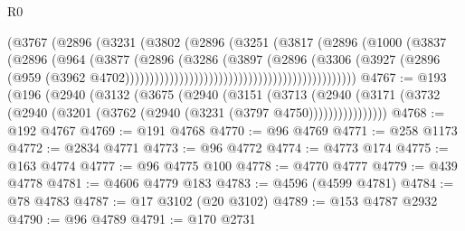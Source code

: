 \begin{lexlean}{R0}
\begin{coremodule}
                                                      (@3767
                                                        (@2896
                                                          (@3231
                                                            (@3802
                                                              (@2896
                                                                (@3251
                                                                  (@3817
                                                                    (@2896
                                                                      (@1000
                                                                        (@3837
                                                                          (@2896
                                                                            (@964
                                                                              (@3877
                                                                                (@2896
                                                                                  (@3286
                                                                                    (@3897
                                                                                      (@2896
                                                                                        (@3306
                                                                                          (@3927
                                                                                            (@2896
                                                                                              (@959
                                                                                                (@3962
                                                                                                  @4702)))))))))))))))))))))))))))))))))))))))))))))))
@4767 := @193
    (@196
      (@2940
        (@3132
          (@3675
            (@2940
              (@3151
                (@3713
                  (@2940
                    (@3171 (@3732 (@2940 (@3201 (@3762 (@2940 (@3231 (@3797 @4750))))))))))))))))
@4768 := @192 @4767
@4769 := @191 @4768
@4770 := @96 @4769
@4771 := @258 @1173
@4772 := @2834 @4771
@4773 := @96 @4772
@4774 := @4773 @174
@4775 := @163 @4774
@4777 := @96 @4775 @100
@4778 := @4770 @4777
@4779 := @439 @4778
@4781 := @4606 @4779 @183
@4783 := @4596 (@4599 @4781)
@4784 := @78 @4783
@4787 := @17 @3102 (@20 @3102)
@4789 := @153 @4787 @2932
@4790 := @96 @4789
@4791 := @170 @2731

\end{coremodule}
\end{lexlean}
